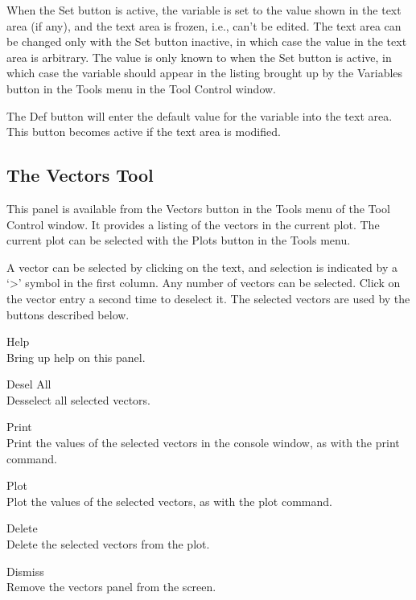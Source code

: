 When the {\cb Set} button is active, the variable is set to the value
shown in the text area (if any), and the text area is frozen, i.e.,
can't be edited.  The text area can be changed only with the {\cb Set}
button inactive, in which case the value in the text area is
arbitrary.  The value is only known to {\WRspice} when the {\cb Set}
button is active, in which case the variable should appear in the
listing brought up by the {\cb Variables} button in the {\cb Tools}
menu in the {\cb Tool Control} window.

The {\cb Def} button will enter the default value for the variable
into the text area.  This button becomes active if the text area is
modified.

\subsection{The Vectors Tool}
\label{vectorspanel}

This panel is available from the {\cb Vectors} button in the {\cb
Tools} menu of the {\cb Tool Control} window.  It provides a listing
of the vectors in the current plot.  The current plot can be selected
with the {\cb Plots} button in the {\cb Tools} menu.

A vector can be selected by clicking on the text, and selection is
indicated by a `{\vt >}' symbol in the first column.  Any number of
vectors can be selected.  Click on the vector entry a second time to
deselect it.  The selected vectors are used by the buttons described
below.

\begin{description}
\item{\cb Help}\\
    Bring up help on this panel.
\item{\cb Desel All}\\
    Desselect all selected vectors.
\item{\cb Print}\\
    Print the values of the selected vectors in the console window,
    as with the {\cb print} command.
\item{\cb Plot}\\
    Plot the values of the selected vectors, as with the {\cb plot}
    command.
\item{\cb Delete}\\
    Delete the selected vectors from the plot.
\item{\cb Dismiss}\\
    Remove the vectors panel from the screen.
\end{description}

